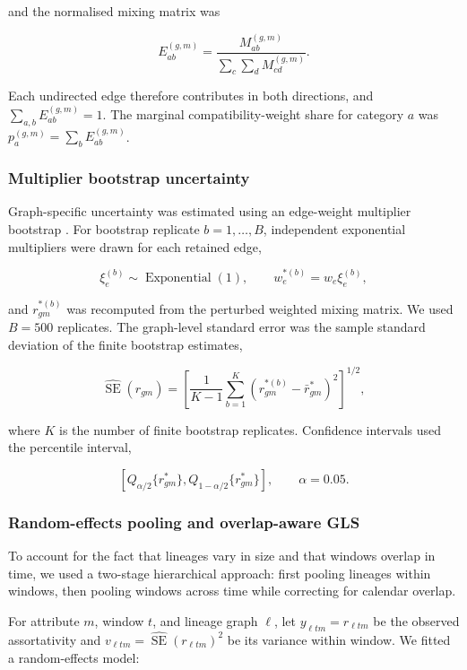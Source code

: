 and the normalised mixing matrix was

\[
	E^{(g,m)}_{ab}
	=
	\frac{M^{(g,m)}_{ab}}
	{\sum_{c}\sum_{d} M^{(g,m)}_{cd}}.
\]

Each undirected edge therefore contributes in both directions, and $\sum_{a,b}E^{(g,m)}_{ab}=1$. The marginal compatibility-weight share for category $a$ was $p^{(g,m)}_a=\sum_b E^{(g,m)}_{ab}$.

\subsubsection{Multiplier bootstrap uncertainty}

Graph-specific uncertainty was estimated using an edge-weight multiplier bootstrap \citep{Efron1979,Praestgaard1993}. For bootstrap replicate $b=1,\ldots,B$, independent exponential multipliers were drawn for each retained edge,

\[
	\xi^{(b)}_e \sim \operatorname{Exponential}(1),
	\qquad
	w^{*(b)}_e = w_e \xi^{(b)}_e,
\]

and $r^{*(b)}_{gm}$ was recomputed from the perturbed weighted mixing matrix. We used $B=500$ replicates. The graph-level standard error was the sample standard deviation of the finite bootstrap estimates,

\[
	\widehat{\operatorname{SE}}(r_{gm})
	=
	\left[
		\frac{1}{K-1}
		\sum_{b=1}^{K}
		\left(r^{*(b)}_{gm}-\bar r^{*}_{gm}\right)^2 %
		\right]^{1/2}, %
\]

where $K$ is the number of finite bootstrap replicates. Confidence intervals used the percentile interval,

\[
	\left[
		Q_{\alpha/2}\{r^{*}_{gm}\},
		Q_{1-\alpha/2}\{r^{*}_{gm}\}
		\right],
	\qquad \alpha=0.05.
\]

\subsubsection{Random-effects pooling and overlap-aware GLS}

To account for the fact that lineages vary in size and that windows overlap in time, we used a two-stage hierarchical approach: first pooling lineages within windows, then pooling windows across time while correcting for calendar overlap.

For attribute $m$, window $t$, and lineage graph $\ell$, let $y_{\ell tm}=r_{\ell tm}$ be the observed assortativity and $v_{\ell tm}=\widehat{\operatorname{SE}}(r_{\ell tm})^2$ be its variance within window. We fitted a random-effects model: %

